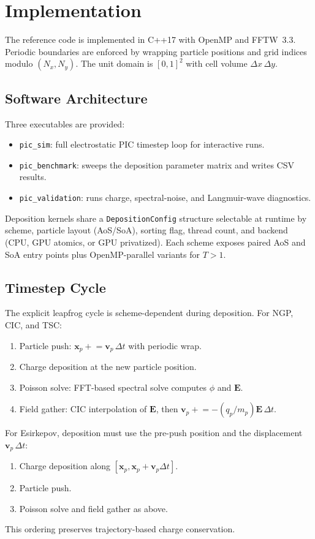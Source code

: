 \section{Implementation}
The reference code is implemented in C++17 with OpenMP and FFTW~3.3.
Periodic boundaries are enforced by wrapping particle positions and grid indices modulo $(N_x,N_y)$.
The unit domain is $[0,1]^2$ with cell volume $\Delta x\,\Delta y$.

\subsection{Software Architecture}
Three executables are provided:
\begin{itemize}
    \item \texttt{pic\_sim}: full electrostatic PIC timestep loop for interactive runs.
    \item \texttt{pic\_benchmark}: sweeps the deposition parameter matrix and writes CSV results.
    \item \texttt{pic\_validation}: runs charge, spectral-noise, and Langmuir-wave diagnostics.
\end{itemize}
Deposition kernels share a \texttt{DepositionConfig} structure selectable at runtime by scheme, particle layout (AoS/SoA), sorting flag, thread count, and backend (CPU, GPU atomics, or GPU privatized).
Each scheme exposes paired AoS and SoA entry points plus OpenMP-parallel variants for $T>1$.

\subsection{Timestep Cycle}
The explicit leapfrog cycle is scheme-dependent during deposition.
For NGP, CIC, and TSC:
\begin{enumerate}
    \item Particle push: $\mathbf{x}_p \mathrel{+}= \mathbf{v}_p\,\Delta t$ with periodic wrap.
    \item Charge deposition at the new particle position.
    \item Poisson solve: FFT-based spectral solve computes $\phi$ and $\mathbf{E}$.
    \item Field gather: CIC interpolation of $\mathbf{E}$, then $\mathbf{v}_p \mathrel{+}= -(q_p/m_p)\mathbf{E}\,\Delta t$.
\end{enumerate}
For Esirkepov, deposition must use the pre-push position and the displacement $\mathbf{v}_p\,\Delta t$:
\begin{enumerate}
    \item Charge deposition along $[\mathbf{x}_p,\mathbf{x}_p+\mathbf{v}_p\Delta t]$.
    \item Particle push.
    \item Poisson solve and field gather as above.
\end{enumerate}
This ordering preserves trajectory-based charge conservation.


